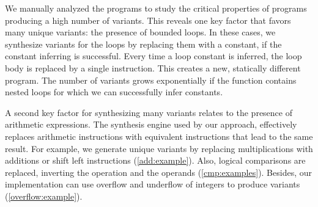 We manually analyzed the programs to study the critical properties of programs producing a high number of variants.
This reveals one key factor that favors many unique variants: the presence of bounded loops. In these cases, we synthesize variants for the loops by replacing them with a constant, if the constant inferring is successful. Every time a loop constant is inferred, the loop body is replaced by a single instruction. This creates a new, statically different program. The number of variants grows exponentially if the function contains nested loops for which we can successfully infer constants. 

A second key factor for synthesizing many variants relates to the presence of arithmetic expressions. The synthesis engine used by our approach, effectively replaces arithmetic instructions with equivalent instructions that lead to the same result. For example, we generate unique variants by replacing multiplications with additions or shift left instructions (\autoref{add:example}). Also, logical comparisons are replaced, inverting the operation and the operands (\autoref{cmp:examples}). Besides, our implementation can use overflow and underflow of integers to produce variants (\autoref{overflow:example}).

